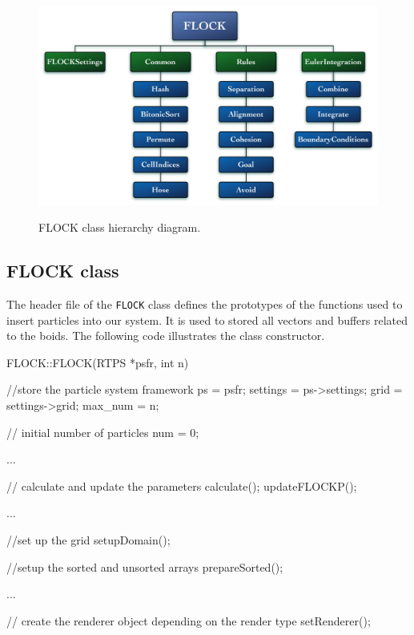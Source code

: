 \begin{figure}[htbp]
\begin{center}
\includegraphics[scale=0.3]{figures/FLOCKdiagramMyrna.pdf}
\caption{FLOCK class hierarchy diagram.} 
\label{flockdiagram}
\end{center}
\end{figure}


\subsection{FLOCK class}
The header file of the \texttt{FLOCK} class defines the prototypes of the 
functions used to insert particles into our system. It is used to stored
all vectors and buffers related to the boids. 
The following code illustrates the class constructor. 

\begin{cppcode}{0}
FLOCK::FLOCK(RTPS *psfr, int n)
 {
 	//store the particle system framework
 	ps = psfr;
	settings = ps->settings;
	grid = settings->grid;
	max_num = n;
	
	// initial number of particles
	num = 0;
 	
	...
 
 	// calculate and update the parameters
	calculate();
	updateFLOCKP();

	...

	//set up the grid
	setupDomain();
	
	//setup the sorted and unsorted arrays
	prepareSorted();
 	 
	 ...
		
	// create the renderer object depending on the render type		
	setRenderer(); 
}
\end{cppcode}

